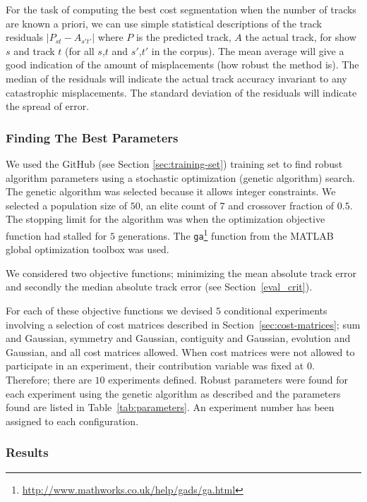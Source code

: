 \documentclass[twocolumn]{article}
\begin{document}
For the task of computing the best cost segmentation when the number of tracks are known a priori, we can use simple statistical descriptions of the track residuals $|P_{st}-A_{s't'}|$ where $P$ is the predicted track, $A$ the actual track, for show $s$ and track $t$ (for all $s$,$t$ and $s'$,$t'$ in the corpus). The mean average will give a good indication of the amount of misplacements (how robust the method is). The median of the residuals will indicate the actual track accuracy invariant to any catastrophic misplacements. The standard deviation of the residuals will indicate the spread of error. 

\subsubsection{Finding The Best Parameters}\label{sec:findingbestcostmatrix}

We used the GitHub (see Section \ref{sec:training-set}) training set to find robust algorithm parameters using a stochastic optimization (genetic algorithm) search. The genetic algorithm was selected because it allows integer constraints. We selected a population size of $50$, an elite count of $7$ and crossover fraction of $0.5$. The stopping limit for the algorithm was when the optimization objective function had stalled for $5$ generations. The \texttt{ga}\footnote{\url{http://www.mathworks.co.uk/help/gads/ga.html}} function from the MATLAB global optimization toolbox was used. 

We considered two objective functions; minimizing the mean absolute track error and secondly the median absolute track error (see Section~\ref{eval_crit}).

For each of these objective functions we devised $5$ conditional experiments involving a selection of cost matrices described in Section~\ref{sec:cost-matrices}; sum and Gaussian, symmetry and Gaussian, contiguity and Gaussian, evolution and Gaussian, and all cost matrices allowed. When cost matrices were not allowed to participate in an experiment, their contribution variable was fixed at $0$. Therefore; there are $10$ experiments defined. Robust parameters were found for each experiment using the genetic algorithm as described and the parameters found are listed in Table~\ref{tab:parameters}. An experiment number has been assigned to each configuration.

\subsubsection{Results}\label{sec:results}
\end{document}
